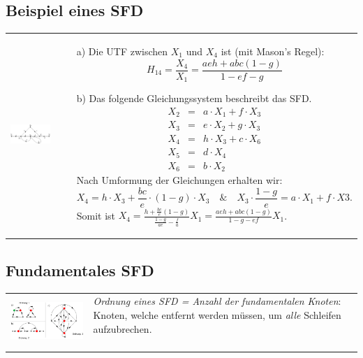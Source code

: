 \subsection{Beispiel eines SFD }
\begin{tabular}{ll}
	\parbox{7cm}{
    	\includegraphics[width=7cm]{./images/sfd-bsp.png}
    }
    
    & \parbox{12cm}{
    \begin{enumerate}
		\item[a)] Die UTF zwischen $X_1$ und $X_4$ ist (mit Mason's Regel):\\
		\begin{equation*}
		H_{14}=\frac{X_4}{X_1}=\frac{aeh+abc(1-g)}{1-ef-g}
		\end{equation*}
		\item[b)] Das folgende Gleichungssystem beschreibt das SFD.
		\begin{eqnarray*}
		X_2 &=&a\cdot X_1+f\cdot X_3\\
		X_3 &=&e\cdot X_2+g\cdot X_3\\
		X_4 &=&h\cdot X_3+c\cdot X_6\\
		X_5 &=&d\cdot X_4\\
		X_6 &=&b\cdot X_2
		\end{eqnarray*}
		Nach Umformung der Gleichungen erhalten wir:
		\begin{equation*}
		X_4=h\cdot X_3+\frac{bc}{e}\cdot (1-g)\cdot X_3\quad\&\quad X_3\cdot
		\frac{1-g}{e}=a\cdot X_1+f\cdot X3.
		\end{equation*}
		Somit ist $X_4=\frac{h+\frac{bc}{e}(1-g)}{\frac{1-g}{ae}-\frac{f}{a}}X_1=\frac{aeh+abc(1-g)}{1-g-ef}X_1$.
	\end{enumerate}}
\end{tabular}

\subsection{Fundamentales SFD }
\begin{tabular}{ll}
	\parbox{7cm}{
    	\includegraphics[width=7cm]{./images/sfd-ordnung.png}
    }
    
    & \parbox{12cm}{
		\textit{Ordnung eines SFD = Anzahl der fundamentalen Knoten}: Knoten, welche
		entfernt werden müssen, um \textit{alle} Schleifen aufzubrechen. \\ \\
	}
\end{tabular}

